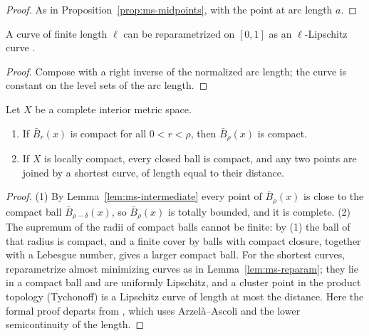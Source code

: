\begin{proof}
  \leanok
  As in Proposition~\ref{prop:ms-midpoints}, with the point at arc length $a$.
\end{proof}

\begin{lemma}
  \label{lem:ms-reparam}
  \leanok
  A curve of finite length $\ell$ can be reparametrized on $[0, 1]$ as an $\ell$-Lipschitz curve
  \cite[Obs.~8.1.5, Cor.~8.1.6]{Lar22}.
\end{lemma}

\begin{proof}
  \leanok
  Compose with a right inverse of the normalized arc length; the curve is constant on the level
  sets of the arc length.
\end{proof}

\begin{theorem}
  \label{thm:ms-hopf-rinow}
  \leanok
  Let $X$ be a complete interior metric space.
  \begin{enumerate}
    \item If $\bar B_r(x)$ is compact for all $0 < r < \rho$, then $\bar B_\rho(x)$ is compact.
    \item If $X$ is locally compact, every closed ball is compact, and any two points are joined
      by a shortest curve, of length equal to their distance.
  \end{enumerate}
\end{theorem}

\begin{proof}
  \leanok
  (1) By Lemma~\ref{lem:ms-intermediate} every point of $\bar B_\rho(x)$ is close to the compact
  ball $\bar B_{\rho - \delta}(x)$, so $\bar B_\rho(x)$ is totally bounded, and it is complete.
  (2) The supremum of the radii of compact balls cannot be finite: by (1) the ball of that radius
  is compact, and a finite cover by balls with compact closure, together with a Lebesgue number,
  gives a larger compact ball. For the shortest curves, reparametrize almost minimizing curves as
  in Lemma~\ref{lem:ms-reparam}; they lie in a compact ball and are uniformly Lipschitz, and a
  cluster point in the product topology (Tychonoff) is a Lipschitz curve of length at most the
  distance. Here the formal proof departs from \cite{Lar22}, which uses Arzelà--Ascoli and the
  lower semicontinuity of the length.
\end{proof}

